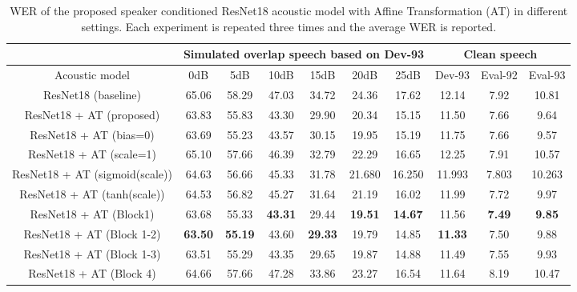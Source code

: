 \documentclass{article}
\begin{document}
\begin{table*}[t]
\setlength{\extrarowheight}{4pt}
\begin{center}
\vspace{-0.4cm}
\caption{ WER of the proposed speaker conditioned ResNet18 acoustic model with Affine Transformation (AT) in different settings. Each experiment is repeated three times and the average WER is reported.}

\begin{tabular}{ |c|c|c|c|c|c|c|c|c|c| }
\cline{2-10}

\multicolumn{1}{c|}{} & \multicolumn{6}{c|}{Simulated overlap speech based on Dev-93} &\multicolumn{3}{c|}{Clean speech} \\ 
\cline{3-6} \cline{7-9} 
\hline
Acoustic model & 0dB & 5dB & 10dB & 15dB & 20dB & 25dB & Dev-93 & Eval-92 & Eval-93 \\
\hline
ResNet18 (baseline) & 65.06&58.29&47.03&34.72&24.36&17.62&12.14&7.92&10.81 \\
ResNet18 + AT (proposed) &63.83&	55.83&	43.30&	29.90&	20.34&	15.15&	11.50&	7.66&	9.64\\
\hline
ResNet18 + AT (bias=0) &63.69&	55.23&	43.57&	30.15&	19.95&	15.19&	11.75&	7.66&	9.57\\
ResNet18 + AT (scale=1)& 65.10& 57.66&	46.39&	32.79&	22.29&	16.65&	12.25&	7.91& 10.57\\
ResNet18 + AT (sigmoid(scale))& 64.63&	56.66&	45.33&	31.78&	21.680&	16.250&	11.993&	7.803&	10.263\\
ResNet18 + AT (tanh(scale))& 64.53&	56.82&	45.27&	31.64&	21.19&	16.02&	11.99&	7.72&	9.97\\
\hline
ResNet18 + AT (Block1)& 63.68&	55.33&	\textbf{43.31}&29.44&	\textbf{19.51}&\textbf{14.67}&11.56&\textbf{7.49}&	\textbf{9.85}\\
ResNet18 + AT (Block 1-2)&\textbf{63.50}&	\textbf{55.19}&	43.60&	\textbf{29.33}&	19.79&	14.85&	\textbf{11.33}&	7.50&	9.88\\
ResNet18 + AT (Block 1-3)&63.51&	55.29&	43.35&	29.65&	19.87&	14.88&	11.49&	7.55&	9.93\\
ResNet18 + AT (Block 4)& 64.66&	57.66&	47.28&	33.86&	23.27&	16.54&	11.64&	8.19&	10.47\\
\hline
\end{tabular}
\vspace{-0.4cm}
\label{tab:at}
\end{center}
\end{table*}
\end{document}
